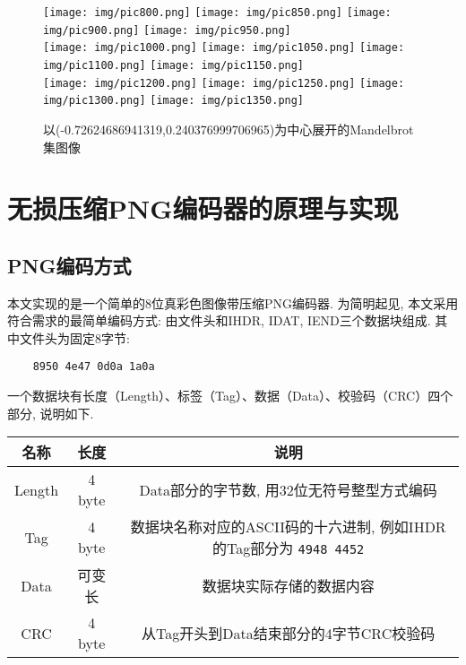 \documentclass[UTF8]{ctexart}
\begin{document}
\begin{figure}[H]
    \centering
    \centering
    \vspace{3pt} \texttt{[image: img/pic800.png]}
    \texttt{[image: img/pic850.png]}
    \texttt{[image: img/pic900.png]}
    \texttt{[image: img/pic950.png]}
    \\
    \vspace{3pt} \texttt{[image: img/pic1000.png]}
    \texttt{[image: img/pic1050.png]}
    \texttt{[image: img/pic1100.png]}
    \texttt{[image: img/pic1150.png]}
    \\
    \centering
    \vspace{3pt} \texttt{[image: img/pic1200.png]}
    \texttt{[image: img/pic1250.png]}
    \texttt{[image: img/pic1300.png]}
    \texttt{[image: img/pic1350.png]}
    \caption{以(-0.72624686941319,0.240376999706965)为中心展开的Mandelbrot集图像}
\end{figure}

\section{无损压缩PNG编码器的原理与实现}

\subsection{PNG编码方式}

本文实现的是一个简单的8位真彩色图像带压缩PNG编码器. 为简明起见, 本文采用符合需求的最简单编码方式: 由文件头和IHDR, IDAT, IEND三个数据块组成. 其中文件头为固定8字节: 

\begin{verbatim}
    8950 4e47 0d0a 1a0a
\end{verbatim}

一个数据块有长度（Length）、标签（Tag）、数据（Data）、校验码（CRC）四个部分, 说明如下.

\begin{table}[H]
    \centering
    \begin{tabular}{|c|c|c|}
        \hline
        \textbf{名称} & \textbf{长度} & \textbf{说明} \\ \hline
        Length & 4 byte & Data部分的字节数, 用32位无符号整型方式编码 \\ \hline
        Tag & 4 byte & 数据块名称对应的ASCII码的十六进制, 例如IHDR的Tag部分为 \verb |4948 4452| \\ \hline
        Data & 可变长 & 数据块实际存储的数据内容 \\ \hline
        CRC & 4 byte & 从Tag开头到Data结束部分的4字节CRC校验码 \\ \hline
    \end{tabular}
\end{table}
\end{document}
